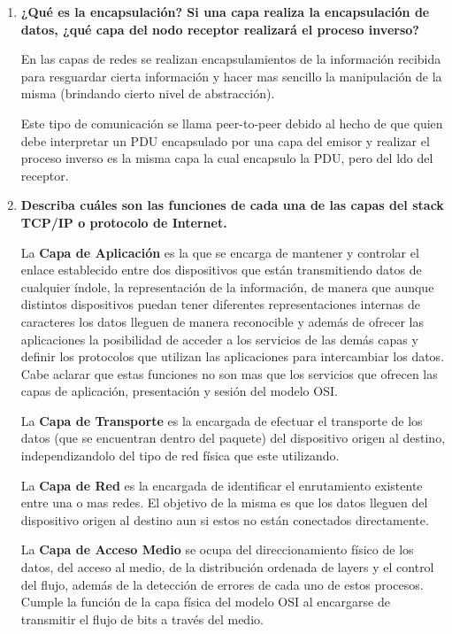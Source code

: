 \documentclass[a4paper,10pt]{article}
\begin{document}
\begin{enumerate}
	\item \textbf{¿Qué es la encapsulación? Si una capa realiza la encapsulación de datos, ¿qué capa del nodo receptor realizará el proceso inverso?}
	
	En las capas de redes se realizan encapsulamientos de la información recibida para resguardar cierta información y hacer mas sencillo la manipulación de la misma (brindando cierto nivel de abstracción).
	
	Este tipo de comunicación se llama peer-to-peer debido al hecho de que quien debe interpretar un PDU encapsulado por una capa del emisor y realizar el proceso inverso es la misma capa la cual encapsulo la PDU, pero del ldo del receptor.  \\
	
	\item \textbf{Describa cuáles son las funciones de cada una de las capas del stack TCP/IP o protocolo de Internet.}
	
	La \textbf{Capa de Aplicación} es la que se encarga de mantener y controlar el enlace establecido entre dos dispositivos que están transmitiendo datos de cualquier índole, la representación de la información, de manera que aunque distintos dispositivos puedan tener diferentes representaciones internas de caracteres los datos lleguen de manera reconocible y además de ofrecer  las aplicaciones la posibilidad de acceder a los servicios de las demás capas y definir los protocolos que utilizan las aplicaciones para intercambiar los datos. Cabe aclarar que estas funciones no son mas que los servicios que ofrecen las capas de aplicación, presentación y sesión del modelo OSI. 

	La \textbf{Capa de Transporte} es la encargada de efectuar el transporte de los datos (que se encuentran dentro del paquete) del dispositivo origen al destino, independizandolo del tipo de red física que este utilizando.

	La \textbf{Capa de Red} es la encargada de identificar el enrutamiento existente entre una o mas redes. El objetivo de la misma es que los datos lleguen del dispositivo origen al destino aun si estos no están conectados directamente.

	La \textbf{Capa de Acceso Medio} se ocupa del direccionamiento físico de los datos, del acceso al medio, de la distribución ordenada de layers y el control del flujo, además de la detección de errores de cada uno de estos procesos. Cumple la función de la capa física del modelo OSI al encargarse de transmitir el flujo de bits a través del medio. \\
	

\end{enumerate}
\end{document}
